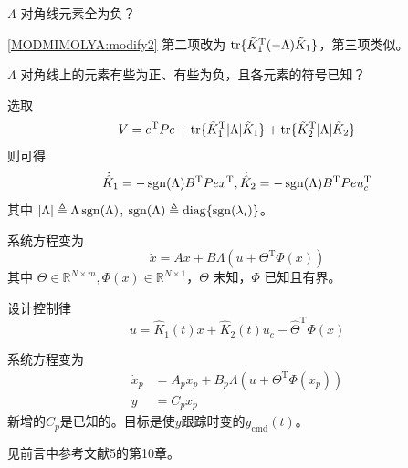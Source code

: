 \begin{problem}
    $\Lambda$ 对角线元素全为负？
\end{problem}
\begin{hint}
\eqref{MODMIMOLYA:modify2} 第二项改为 $\operatorname{tr} \{ \tilde{K}^\mathrm{T}_1 (- \Lambda) \tilde{K} _1 \}$，第三项类似。
\end{hint}
\begin{problem}
    $\Lambda$ 对角线上的元素有些为正、有些为负，且各元素的符号已知？
\end{problem}
\begin{hint}
    选取\[ V = e^\mathrm{T} P  e +\operatorname{tr} \{ \tilde{K}^\mathrm{T}_1 |
       \Lambda | \tilde{K} _1 \} +\operatorname{tr} \{
       \tilde{K}^\mathrm{T}_2 | \Lambda | \tilde{K} _2 \} \]
    则可得
    \[ \dot{\hat{K}} _1 = -\operatorname{sgn} (\Lambda) B^\mathrm{T}  P  e
       x^\mathrm{T}, \dot{\hat{K}} _2 = -\operatorname{sgn} (\Lambda) B^\mathrm{T}
       P  e  u^\mathrm{T}_c \]
    其中 $| \Lambda | \triangleq \Lambda \operatorname{sgn}
    (\Lambda)$, $\operatorname{sgn} (\Lambda) \triangleq
    \operatorname{diag} \{ \operatorname{sgn}
    (\lambda_i) \}$。
\end{hint}

\begin{problem}\label{Pro:uncertainty}
系统方程变为
  \begin{equation}
      \dot{x} = A  x + B \Lambda (u + \Theta^\mathrm{T}\Phi (x))\label{Sys:MRAC:MIMO_with_dis}
  \end{equation}
  其中 $\Theta \in \mathbb{R}^{N \times m}, \Phi (x) \in \mathbb{R}^{N \times 1}$，$\Theta$ 未知，$\Phi$ 已知且有界。
\end{problem}
\begin{hint}
    设计控制律\[ u = \hat{K}_1 (t) x + \hat{K}_2 (t) u_c - \hat{\Theta}^\mathrm{T}\Phi (x)  \]
\end{hint}
\begin{problem}
系统方程变为
  \begin{align*}
      \dot{x}_p &= A_p  x_p + B_p \Lambda (u + \Theta^\mathrm{T}\Phi (x_p))\\
      y&=C_px_p
  \end{align*}
  新增的$C_p$是已知的。目标是使$y$跟踪时变的$y_{\mathrm{cmd}}(t)$。
\end{problem}
\begin{hint}
    见前言中参考文献5的第10章。
\end{hint}
